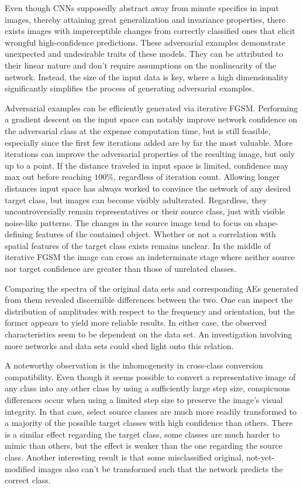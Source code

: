 \documentclass[11pt, a4paper]{article}
\begin{document}
Even though CNNs supposedly abstract away from minute specifics in input images, thereby attaining great generalization and invariance properties, there exists images with imperceptible changes from correctly classified ones that elicit wrongful high-confidence predictions. These adversarial examples demonstrate unexpected and undesirable traits of these models. They can be attributed to their linear nature and don't require assumptions on the nonlinearity of the network. Instead, the size of the input data is key, where a high dimensionality significantly simplifies the process of generating adversarial examples.

Adversarial examples can be efficiently generated via iterative FGSM. Performing a gradient descent on the input space can notably improve network confidence on the adversarial class at the expense computation time, but is still feasible, especially since the first few iterations added are by far the most valuable. More iterations can improve the adversarial properties of the resulting image, but only up to a point. If the distance traveled in input space is limited, confidence may max out before reaching $100\%$, regardless of iteration count. Allowing longer distances input space has always worked to convince the network of any desired target class, but images can become visibly adulterated. Regardless, they uncontroversially remain representatives or their source class, just with visible noise-like patterns. The changes in the source image tend to focus on shape-defining features of the contained object. Whether or not a correlation with spatial features of the target class exists remains unclear. In the middle of iterative FGSM the image can cross an indeterminate stage where neither source nor target confidence are greater than those of unrelated classes.

Comparing the spectra of the original data sets and corresponding AEs generated from them revealed discernible differences between the two. One can inspect the distribution of amplitudes with respect to the frequency and orientation, but the former appears to yield more reliable results. In either case, the observed characteristics seem to be dependent on the data set. An investigation involving more networks and data sets could shed light onto this relation.

A noteworthy observation is the inhomogeneity in cross-class conversion compatibility. Even though it seems possible to convert a representative image of any class into any other class by using a sufficiently large step size, conspicuous differences occur when using a limited step size to preserve the image's visual integrity. In that case, select source classes are much more readily transformed to a majority of the possible target classes with high confidence than others. There is a similar effect regarding the target class, some classes are much harder to mimic than others, but the effect is weaker than the one regarding the source class. Another interesting result is that some misclassified original, not-yet-modified images also can't be transformed such that the network predicts the correct class.
\end{document}
